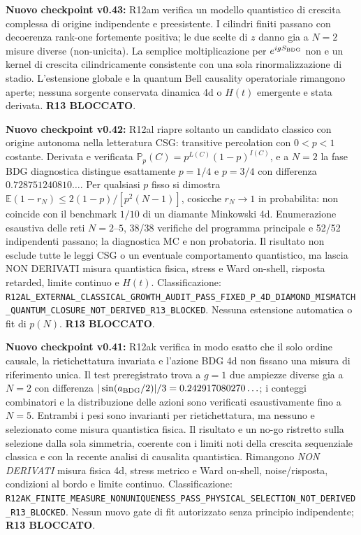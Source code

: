 \documentclass[11pt,a4paper]{article}
\begin{document}
\textbf{Nuovo checkpoint v0.43:} R12am verifica un modello quantistico di crescita complessa di origine indipendente e preesistente. I cilindri finiti passano con decoerenza rank-one fortemente positiva; le due scelte di $z$ danno gia a $N=2$ misure diverse (non-unicita). La semplice moltiplicazione per $e^{igS_{\rm BDG}}$ non e un kernel di crescita cilindricamente consistente con una sola rinormalizzazione di stadio. L'estensione globale e la quantum Bell causality operatoriale rimangono aperte; nessuna sorgente conservata dinamica 4d o $H(t)$ emergente e stata derivata. \textbf{R13 BLOCCATO}.


\textbf{Nuovo checkpoint v0.42:} R12al riapre soltanto un candidato classico con origine autonoma nella letteratura CSG: transitive percolation con $0<p<1$ costante. Derivata e verificata $\mathbb P_p(C)=p^{L(C)}(1-p)^{I(C)}$, e a $N=2$ la fase BDG diagnostica distingue esattamente $p=1/4$ e $p=3/4$ con differenza $0.728751240810\ldots$. Per qualsiasi $p$ fisso si dimostra $\mathbb E(1-r_N)\le2(1-p)/[p^2(N-1)]$, cosicche $r_N\to1$ in probabilita: non coincide con il benchmark $1/10$ di un diamante Minkowski 4d. Enumerazione esaustiva delle reti $N=2$--$5$, 38/38 verifiche del programma principale e 52/52 indipendenti passano; la diagnostica MC e non probatoria. Il risultato non esclude tutte le leggi CSG o un eventuale comportamento quantistico, ma lascia NON DERIVATI misura quantistica fisica, stress e Ward on-shell, risposta retarded, limite continuo e $H(t)$. Classificazione: \nolinkurl{R12AL_EXTERNAL_CLASSICAL_GROWTH_AUDIT_PASS_FIXED_P_4D_DIAMOND_MISMATCH_QUANTUM_CLOSURE_NOT_DERIVED_R13_BLOCKED}. Nessuna estensione automatica o fit di $p(N)$. \textbf{R13 BLOCCATO}.\par\medskip


\textbf{Nuovo checkpoint v0.41:} R12ak verifica in modo esatto che il solo ordine causale, la rietichettatura invariata e l'azione BDG 4d non fissano una misura di riferimento unica. Il test preregistrato trova a $g=1$ due ampiezze diverse gia a $N=2$ con differenza $|\sin(a_{\rm BDG}/2)|/3=0.242917080270\ldots$; i conteggi combinatori e la distribuzione delle azioni sono verificati esaustivamente fino a $N=5$. Entrambi i pesi sono invarianti per rietichettatura, ma nessuno e selezionato come misura quantistica fisica. Il risultato e un no-go ristretto sulla selezione dalla sola simmetria, coerente con i limiti noti della crescita sequenziale classica e con la recente analisi di causalita quantistica. Rimangono \emph{NON DERIVATI} misura fisica 4d, stress metrico e Ward on-shell, noise/risposta, condizioni al bordo e limite continuo. Classificazione: \nolinkurl{R12AK_FINITE_MEASURE_NONUNIQUENESS_PASS_PHYSICAL_SELECTION_NOT_DERIVED_R13_BLOCKED}. Nessun nuovo gate di fit autorizzato senza principio indipendente; \textbf{R13 BLOCCATO}.\par\medskip
\end{document}
